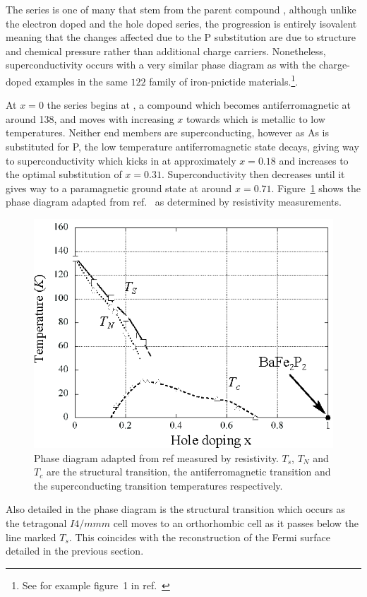 The \BaFePAs series is one of many that stem from the parent compound \BaFeAs, although unlike the electron doped \BaCoFeAs and the hole doped \BaKFeAs series, the \BaFePAs progression is entirely isovalent meaning that the changes affected due to the P substitution are due to structure and chemical pressure rather than additional charge carriers. Nonetheless, superconductivity occurs with a very similar phase diagram as with the charge-doped examples in the same $122$ family of iron-pnictide materials.\footnote{See for example figure~1 in ref.~\cite{Paglione2010}}. 

At $x=0$ the \BaFePAs series begins at \BaFeAs, a compound which becomes antiferromagnetic at around \unit{138}{\kelvin}, and moves with increasing $x$ towards \BaFeP which is metallic to low temperatures. Neither end members are superconducting, however as As is substituted for P, the low temperature antiferromagnetic state decays, giving way to superconductivity which kicks in at approximately $x=0.18$ and increases to the optimal substitution of $x=0.31$. Superconductivity then decreases until it gives way to a paramagnetic ground state at around $x=0.71$. Figure~\ref{Fig:Intro:PhaseDiagram} shows the phase diagram adapted from ref.~\cite{Nakai2010a} as determined by resistivity measurements. 
\begin{figure}[htbp]
    \begin{center}
        \includegraphics[scale=1.0]{Chapter-Introduction/Figures/PhaseDiagram/PhaseDiagram}
        \caption{Phase diagram adapted from ref \cite{Nakai2010a} measured by resistivity. $T_s$, $T_N$ and $T_c$ are the structural transition, the antiferromagnetic transition and the superconducting transition temperatures respectively.}
        \label{Fig:Intro:PhaseDiagram}
    \end{center}
\end{figure}
Also detailed in the phase diagram is the structural transition which occurs as the tetragonal $I4/mmm$ cell moves to an orthorhombic cell as it passes below the line marked $T_s$. This coincides with the reconstruction of the Fermi surface detailed in the previous section.

